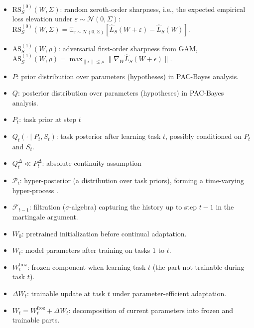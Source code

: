 \documentclass[10pt]{article} %
\begin{document}
\begin{itemize}
\item $\mathrm{RS}_S^{(0)}(W,\Sigma)$: random zeroth-order sharpness, i.e., the expected empirical loss elevation under $\varepsilon\sim\mathcal N(0,\Sigma)$:
$\mathrm{RS}_S^{(0)}(W,\Sigma)=\mathbb E_{\varepsilon\sim\mathcal N(0,\Sigma)}[\hat L_S(W+\varepsilon)-\hat L_S(W)]$.
\item $\mathrm{AS}^{(1)}_S(W,\rho)$: adversarial first-order sharpness  from GAM,
$\mathrm{AS}^{(1)}_S(W,\rho)=\max_{\|\epsilon\|\le\rho}\|\nabla_W\widehat L_S(W+\epsilon)\|$.

\item $P$: prior distribution over parameters (hypotheses) in PAC-Bayes analysis.
\item $Q$: posterior distribution over parameters (hypotheses) in PAC-Bayes analysis.

\item $P_t$: task prior at step $t$ 
\item $Q_t(\cdot \mid P_t,S_t)$: task posterior after learning task $t$, possibly conditioned on $P_t$ and $S_t$.
\item $Q_t^\Delta \ll P_t^\Delta$: absolute continuity assumption
\item $\mathcal P_t$: hyper-posterior (a distribution over task priors), forming a time-varying hyper-process . 
\item $\mathcal F_{t-1}$: filtration ($\sigma$-algebra) capturing the history up to step $t-1$ in the martingale argument.

\item $W_0$: pretrained initialization before continual adaptation.
\item $W_t$: model parameters after training on tasks $1$ to $t$.
\item $W_t^{\mathrm{froz}}$: frozen component when learning task $t$ (the part not trainable during task $t$).
\item $\Delta W_t$: trainable update at task $t$ under parameter-efficient adaptation.
\item $W_t = W_t^{\mathrm{froz}} + \Delta W_t$: decomposition of current parameters into frozen and trainable parts. 






\end{itemize}
\end{document}
